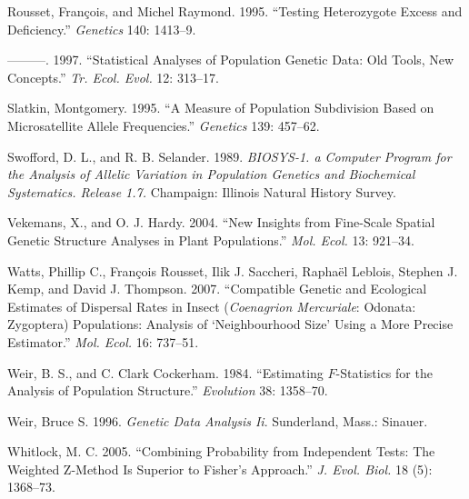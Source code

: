 \documentclass[12pt,]{book}
\begin{document}
\hypertarget{ref-RoussetR95}{}
Rousset, François, and Michel Raymond. 1995. ``Testing Heterozygote
Excess and Deficiency.'' \emph{Genetics} 140: 1413--9.

\hypertarget{ref-RoussetR97}{}
---------. 1997. ``Statistical Analyses of Population Genetic Data: Old
Tools, New Concepts.'' \emph{Tr. Ecol. Evol.} 12: 313--17.

\hypertarget{ref-Slatkin95}{}
Slatkin, Montgomery. 1995. ``A Measure of Population Subdivision Based
on Microsatellite Allele Frequencies.'' \emph{Genetics} 139: 457--62.

\hypertarget{ref-SwoffordS89}{}
Swofford, D. L., and R. B. Selander. 1989. \emph{BIOSYS-1. a Computer
Program for the Analysis of Allelic Variation in Population Genetics and
Biochemical Systematics. Release 1.7.} Champaign: Illinois Natural
History Survey.

\hypertarget{ref-VekemansH04}{}
Vekemans, X., and O. J. Hardy. 2004. ``New Insights from Fine-Scale
Spatial Genetic Structure Analyses in Plant Populations.'' \emph{Mol.
Ecol.} 13: 921--34.

\hypertarget{ref-WattsX07}{}
Watts, Phillip C., François Rousset, Ilik J. Saccheri, Raphaël Leblois,
Stephen J. Kemp, and David J. Thompson. 2007. ``Compatible Genetic and
Ecological Estimates of Dispersal Rates in Insect (\emph{Coenagrion
Mercuriale}: Odonata: Zygoptera) Populations: Analysis of `Neighbourhood
Size' Using a More Precise Estimator.'' \emph{Mol. Ecol.} 16: 737--51.

\hypertarget{ref-WeirC84}{}
Weir, B. S., and C. Clark Cockerham. 1984. ``Estimating \(F\)-Statistics
for the Analysis of Population Structure.'' \emph{Evolution} 38:
1358--70.

\hypertarget{ref-WeirbkII}{}
Weir, Bruce S. 1996. \emph{Genetic Data Analysis Ii}. Sunderland, Mass.:
Sinauer.

\hypertarget{ref-Whitlock05}{}
Whitlock, M. C. 2005. ``Combining Probability from Independent Tests:
The Weighted Z-Method Is Superior to Fisher's Approach.'' \emph{J. Evol.
Biol.} 18 (5): 1368--73.
\end{document}
